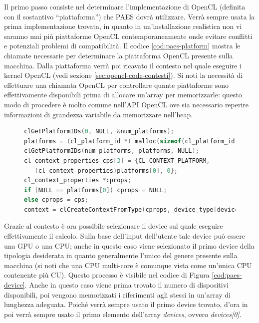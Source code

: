 \documentclass[12pt,a4paper,oneside]{book}
\begin{document}
Il primo passo consiste nel determinare l'implementazione di \ac{OpenCL} (definita con il sostantivo ``piattaforma'') che PAES dovrà utilizzare. Verrà sempre usata la prima implementazione trovata, in quanto in un'installazione realistica non vi saranno mai più piattaforme \ac{OpenCL} contemporaneamente onde evitare conflitti e potenziali problemi di compatibilità. Il codice \ref{cod:paes-platform} mostra le chiamate necessarie per determinare la piattaforma \ac{OpenCL} presente sulla macchina. Dalla piattaforma verrà poi ricavato il contesto nel quale eseguire i kernel \ac{OpenCL} (vedi sezione \ref{sec:opencl-code-contesti}). Si noti la necessità di effettuare una chiamata \ac{OpenCL} per controllare quante piattaforme sono effettivamente disponibili prima di allocare un'array per memorizzarle: questo modo di procedere è molto comune nell'\ac{API} \ac{OpenCL} ove sia necessario reperire informazioni di grandezza variabile da memorizzare nell'heap.

\begin{figure}
\begin{lstlisting}[caption={\textit{Scelta dell'implementazione di \ac{OpenCL} da utilizzare.}},label={cod:paes-platform},language=C]
clGetPlatformIDs(0, NULL, &num_platforms);
platforms = (cl_platform_id *) malloc(sizeof(cl_platform_id) * num_platforms);
clGetPlatformIDs(num_platforms, platforms, NULL);	
cl_context_properties cps[3] = {CL_CONTEXT_PLATFORM,
   (cl_context_properties)platforms[0], 0};
cl_context_properties *cprops;
if (NULL == platforms[0]) cprops = NULL;
else cprops = cps;
context = clCreateContextFromType(cprops, device_type[device], NULL, NULL, &error);
\end{lstlisting}
\end{figure}

Grazie al contesto è ora possibile selezionare il device sul quale eseguire effettivamente il calcolo. Sulla base dell'input dell'utente tale device può essere una \ac{GPU} o una \ac{CPU}; anche in questo caso viene selezionato il primo device della tipologia desiderata in quanto generalmente l'unico del genere presente sulla macchina (si noti che una \ac{CPU} multi-core è comunque vista come un'unica \ac{CPU} contenente più \ac{CU}). Questo processo è visibile nel codice di Figura \ref{cod:paes-device}. Anche in questo caso viene prima trovato il numero di dispositivi disponibili, poi vengono memorizzati i riferimenti agli stessi in un'array di lunghezza adeguata. Poiché verrà sempre usato il primo device trovato, d'ora in poi verrà sempre usato il primo elemento dell'array \textit{devices}, ovvero \textit{devices[0]}.
\end{document}
